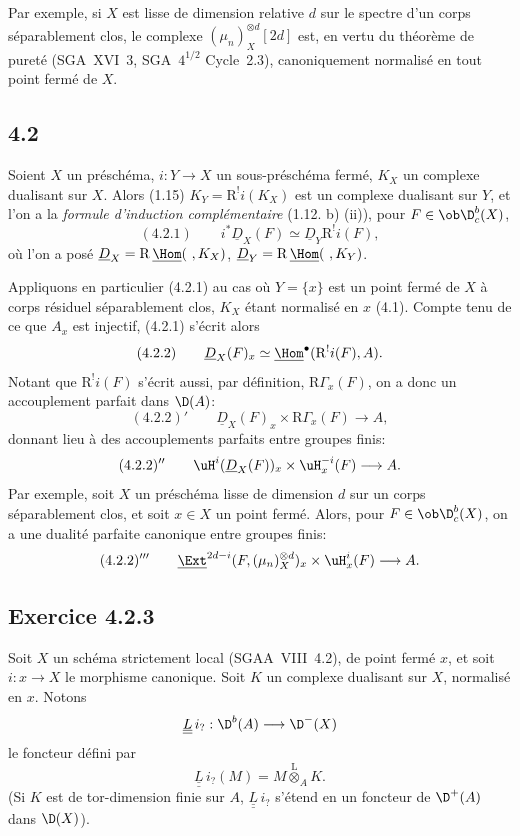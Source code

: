 Par
exemple, si $X$ est lisse de dimension relative $d$ sur le spectre d'un corps séparablement clos, le complexe $(\mu_n)_X^{\otimes d}[2d]$ est, en vertu du théorème de pureté (SGA~XVI~3, SGA~$4^{1/2}$ Cycle~2.3), canoniquement normalisé en tout point fermé de $X$.

\subsection*{4.2}
Soient $X$ un préschéma, $i:Y\to X$ un sous-préschéma fermé, $K_X$ un complexe dualisant sur $X$. Alors (1.15) $K_Y=\mathrm{R}^{!}i(K_X)$ est un complexe dualisant sur $Y$, et l'on a la \emph{formule d'induction complémentaire} (1.12. b) (ii)), pour $F\in \ob\D_c^b(X)$,
\[
(4.2.1)\qquad i^*\underline{D}_X(F)\simeq\underline{D}_Y\mathrm{R}^{!}i(F),
\]
où l'on a posé $\underline{D}_X=\mathrm{R}\,\underline{\Hom}(\ ,K_X)$, $\underline{D}_Y=\mathrm{R}\,\underline{\Hom}(\ ,K_Y)$.

Appliquons en particulier (4.2.1) au cas où $Y=\{x\}$ est un point fermé de $X$ à corps résiduel séparablement clos, $K_X$ étant normalisé en $x$ (4.1). Compte tenu de ce que $A_x$ est injectif, (4.2.1) s'écrit alors
\[
(4.2.2)\qquad \underline{D}_X(F)_x\simeq\underline{\Hom}^{\bullet}(\mathrm{R}^{!}i(F),A).
\]
Notant que $\mathrm{R}^{!}i(F)$ s'écrit aussi, par définition, $\mathrm{R}\Gamma_x(F)$, on a donc un accouplement parfait dans $\D(A)$:
\[
(4.2.2)'\qquad \underline{D}_X(F)_x\times \mathrm{R}\Gamma_x(F)\longrightarrow A,
\]
donnant lieu à des accouplements parfaits entre groupes finis:
\[
(4.2.2)''\qquad \uH^i(\underline{D}_X(F))_x\times \uH_x^{-i}(F)\longrightarrow A.
\]
Par exemple, soit $X$ un préschéma lisse de dimension $d$ sur un corps séparablement clos, et soit $x\in X$ un point fermé. Alors, pour $F\in\ob\D_c^b(X)$, on a une dualité parfaite canonique entre groupes finis:
\[
(4.2.2)'''\qquad \underline{\Ext}^{2d-i}(F,(\mu_n)_X^{\otimes d})_x\times \uH_x^i(F)\longrightarrow A.
\]

\subsection*{Exercice 4.2.3}
Soit $X$ un schéma strictement local (SGAA~VIII~4.2), de point fermé $x$, et soit $i:x\to X$ le morphisme canonique. Soit $K$ un complexe dualisant sur $X$, normalisé en $x$. Notons
\[
\underline{\underline{L}}\, i_? : \D^b(A)\longrightarrow \D^-(X)
\]
le foncteur défini par
\[
\underline{\underline{L}}\, i_?(M)=M\overset{\mathrm{L}}{\otimes}_A K.
\]
(Si $K$ est de tor-dimension finie sur $A$, $\underline{\underline{L}}\, i_?$ s'étend en un foncteur de $\D^+(A)$ dans $\D(X)$).

